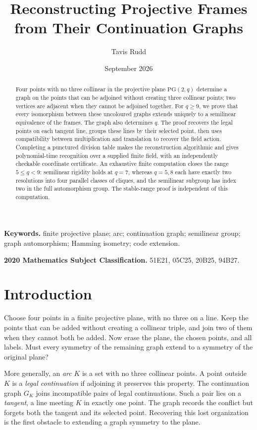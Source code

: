 \documentclass[11pt]{article}
\title{Reconstructing Projective Frames from Their Continuation Graphs}
\author{Tavis Rudd}
\date{September 2026}
\theoremstyle{definition}
\theoremstyle{remark}
\newcommand{\PG}{\mathrm{PG}}
\begin{document}
\maketitle

\begin{abstract}
Four points with no three collinear in the projective plane $\PG(2,q)$
determine a graph on the points that can
be adjoined without creating three collinear points; two vertices are
adjacent when they cannot be adjoined together. For $q\ge9$, we prove
that every isomorphism between these uncoloured graphs extends uniquely
to a semilinear equivalence of the frames. The graph also determines $q$.
The proof recovers the legal points on each tangent line, groups these
lines by their selected point, then uses
compatibility between multiplication and translation to recover the field
action. Completing a punctured division table makes the reconstruction
algorithmic and gives polynomial-time recognition over a supplied finite
field, with an independently checkable coordinate certificate.
An exhaustive finite computation closes the range $5\le q<9$:
semilinear rigidity holds at $q=7$, whereas $q=5,8$ each have exactly
two resolutions into four parallel classes of cliques, and the
semilinear subgroup has index two in the full automorphism group.
The stable-range proof is independent of this computation.
\end{abstract}

\noindent\textbf{Keywords.} finite projective plane; arc; continuation
graph; semilinear group; graph automorphism; Hamming isometry; code extension.

\smallskip
\noindent\textbf{2020 Mathematics Subject Classification.} 51E21, 05C25,
20B25, 94B27.

\section{Introduction}

Choose four points in a finite projective plane, with no three on a line.
Keep the points that can be added without creating a collinear triple,
and join two of them when they cannot both be added. Now erase the plane,
the chosen points, and all labels. Must every symmetry of the remaining
graph extend to a symmetry of the original plane?

More generally, an \emph{arc} $K$ is a set with no three collinear points.
A point outside $K$ is a \emph{legal continuation} if adjoining it preserves
this property. The continuation graph $G_K$ joins incompatible pairs of
legal continuations. Such a pair lies on a \emph{tangent}, a line meeting
$K$ in exactly one point. The graph records the conflict but forgets both
the tangent and its selected point. Recovering this lost organization is
the first obstacle to extending a graph symmetry to the plane.
\end{document}
